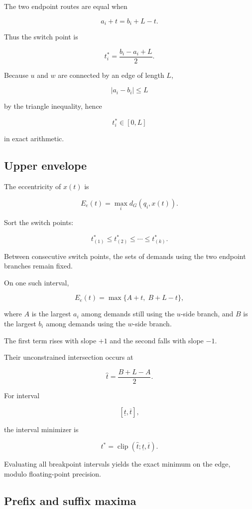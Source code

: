\documentclass[11pt]{article}
\newcommand{\clip}{\operatorname{clip}}
\begin{document}
The two endpoint routes are equal when

\[
a_i+t
=
b_i+L-t.
\]

Thus the switch point is

\begin{equation}
t_i^*
=
\frac{b_i-a_i+L}{2}.
\label{eq:switch}
\end{equation}

Because \(u\) and \(w\) are connected by an edge of length \(L\),

\[
|a_i-b_i|\le L
\]

by the triangle inequality, hence

\[
t_i^*\in[0,L]
\]

in exact arithmetic.

\subsection{Upper envelope}

The eccentricity of \(x(t)\) is

\[
E_e(t)
=
\max_i d_G(q_i,x(t)).
\]

Sort the switch points:

\[
t_{(1)}^*
\le
t_{(2)}^*
\le
\cdots
\le
t_{(k)}^*.
\]

Between consecutive switch points, the sets of demands using the two endpoint
branches remain fixed.

On one such interval,

\[
E_e(t)
=
\max\{A+t,\;B+L-t\},
\]

where \(A\) is the largest \(a_i\) among demands still using the \(u\)-side
branch, and \(B\) is the largest \(b_i\) among demands using the \(w\)-side
branch.

The first term rises with slope \(+1\) and the second falls with slope \(-1\).

Their unconstrained intersection occurs at

\[
\widehat t
=
\frac{B+L-A}{2}.
\]

For interval

\[
[\underline t,\overline t],
\]

the interval minimizer is

\[
t^*
=
\clip(
\widehat t;
\underline t,
\overline t
).
\]

Evaluating all breakpoint intervals yields the exact minimum on the edge,
modulo floating-point precision.

\subsection{Prefix and suffix maxima}
\end{document}
